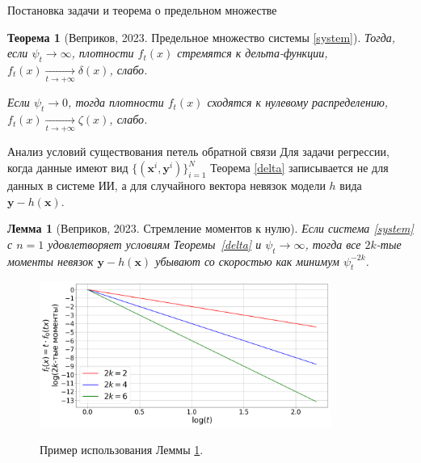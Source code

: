 \documentclass{beamer}
\newtheorem{theorem_rus}{Теорема}
\newtheorem{lemma_rus}{Лемма}
\begin{document}
\begin{frame}{Постановка задачи и теорема о предельном множестве}
\begin{theorem_rus}[Веприков, 2023. Предельное множество системы \eqref{system}]
        \color{black}Тогда, если $\psi_t \to \infty$, плотности $f_t(x)$ стремятся к дельта-функции, $f_t(x) \underset{t \to +\infty}{\longrightarrow} \delta(x)$, слабо.  
    
        Если $\psi_t \to 0$, тогда плотности $f_t(x)$ сходятся к нулевому распределению, $f_t(x) \underset{t \to +\infty}{\longrightarrow} \zeta(x)$, слабо.
    \end{theorem_rus}
\end{frame}
\begin{frame}{Анализ условий существования петель обратной связи}
    \vspace{-1mm} 
    Для задачи регрессии, когда данные имеют вид $\{(\textbf{x}^i, \textbf{y}^i) \}_{i=1}^N$ Теорема \ref{delta} записывается не для данных в системе ИИ, а для случайного вектора невязок модели $h$ вида $\textbf{y} - h(\textbf{x})$.
    \vspace{-1mm}
    \begin{lemma_rus}[Веприков, 2023. Стремление моментов к нулю] \label{moments}
        Если система \eqref{system} с $n=1$ удовлетворяет условиям Теоремы~\ref{delta} и $\psi_t \to \infty$, тогда все $2k$-тые моменты невязок 
        $\textbf{y} - h(\textbf{x})$ убывают со скоростью как минимум $\psi_t^{-2k}$.
    \end{lemma_rus}
    \vspace{-2mm}
    \begin{figure}
        \centering
        \includegraphics[width=0.85\textwidth]{fig/fig2.png}
        \vspace{-3mm}
        
        Пример использования Леммы \ref{moments}.
    \end{figure}
\end{frame}
\end{document}

